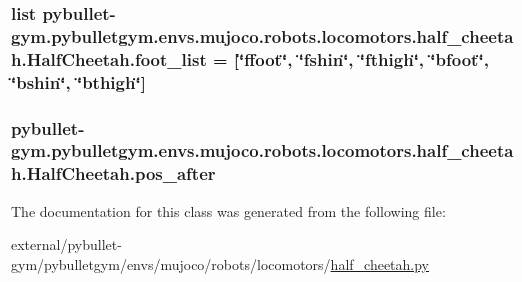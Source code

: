 \subsubsection[{\texorpdfstring{foot\+\_\+list}{foot_list}}]{\setlength{\rightskip}{0pt plus 5cm}list pybullet-\/gym.\+pybulletgym.\+envs.\+mujoco.\+robots.\+locomotors.\+half\+\_\+cheetah.\+Half\+Cheetah.\+foot\+\_\+list = \mbox{[}\char`\"{}ffoot\char`\"{}, \char`\"{}fshin\char`\"{}, \char`\"{}fthigh\char`\"{}, \char`\"{}bfoot\char`\"{}, \char`\"{}bshin\char`\"{}, \char`\"{}bthigh\char`\"{}\mbox{]}\hspace{0.3cm}{\ttfamily [static]}}\hypertarget{classpybullet-gym_1_1pybulletgym_1_1envs_1_1mujoco_1_1robots_1_1locomotors_1_1half__cheetah_1_1_half_cheetah_aee727a392b1336c33a82df87c26315d0}{}\label{classpybullet-gym_1_1pybulletgym_1_1envs_1_1mujoco_1_1robots_1_1locomotors_1_1half__cheetah_1_1_half_cheetah_aee727a392b1336c33a82df87c26315d0}
\subsubsection[{\texorpdfstring{pos\+\_\+after}{pos_after}}]{\setlength{\rightskip}{0pt plus 5cm}pybullet-\/gym.\+pybulletgym.\+envs.\+mujoco.\+robots.\+locomotors.\+half\+\_\+cheetah.\+Half\+Cheetah.\+pos\+\_\+after}\hypertarget{classpybullet-gym_1_1pybulletgym_1_1envs_1_1mujoco_1_1robots_1_1locomotors_1_1half__cheetah_1_1_half_cheetah_a6df842c284d7b020e1847175aa46ff17}{}\label{classpybullet-gym_1_1pybulletgym_1_1envs_1_1mujoco_1_1robots_1_1locomotors_1_1half__cheetah_1_1_half_cheetah_a6df842c284d7b020e1847175aa46ff17}


The documentation for this class was generated from the following file\+:\begin{DoxyCompactItemize}
\item 
external/pybullet-\/gym/pybulletgym/envs/mujoco/robots/locomotors/\hyperlink{mujoco_2robots_2locomotors_2half__cheetah_8py}{half\+\_\+cheetah.\+py}\end{DoxyCompactItemize}
